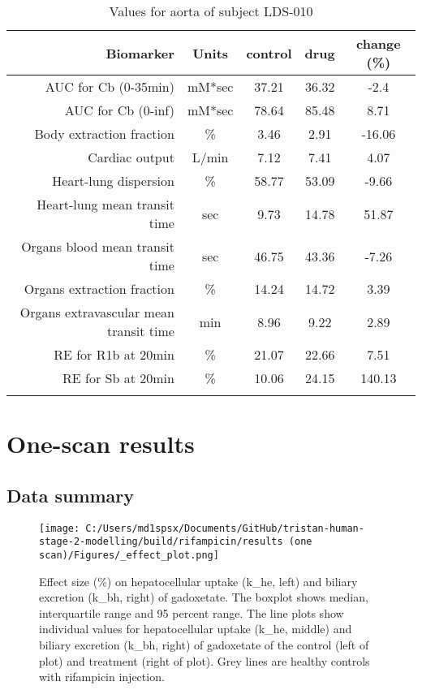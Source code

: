 \documentclass{epflreport}%
\begin{document}
\begin{longtable}{rcccc}%
\hline%
Biomarker&Units&control&drug&change (\%)\\%
\hline%
AUC for Cb (0{-}35min)&mM*sec&37.21&36.32&{-}2.4\\%
AUC for Cb (0{-}inf)&mM*sec&78.64&85.48&8.71\\%
Body extraction fraction&\%&3.46&2.91&{-}16.06\\%
Cardiac output&L/min&7.12&7.41&4.07\\%
Heart{-}lung dispersion&\%&58.77&53.09&{-}9.66\\%
Heart{-}lung mean transit time&sec&9.73&14.78&51.87\\%
Organs blood mean transit time&sec&46.75&43.36&{-}7.26\\%
Organs extraction fraction&\%&14.24&14.72&3.39\\%
Organs extravascular mean transit time&min&8.96&9.22&2.89\\%
RE for R1b at 20min&\%&21.07&22.66&7.51\\%
RE for Sb at 20min&\%&10.06&24.15&140.13\\%
\hline%
\caption{Values for aorta of subject LDS-010} \\%
\end{longtable}%
\clearpage%
\chapter{One{-}scan results}%
\section{Data summary}%
\label{sec:Datasummary}%

%


\begin{figure}[h!]%
\centering%
\texttt{[image: C:/Users/md1spsx/Documents/GitHub/tristan-human-stage-2-modelling/build/rifampicin/results (one scan)/Figures/\_effect\_plot.png]}%
\caption{Effect size (\%) on hepatocellular uptake (k\_he, left) and biliary excretion (k\_bh, right) of gadoxetate. The boxplot shows median, interquartile range and 95 percent range. The line plots show individual values for hepatocellular uptake (k\_he, middle) and biliary excretion (k\_bh, right) of gadoxetate of the control (left of plot) and treatment (right of plot). Grey lines are healthy controls with rifampicin injection.}%
\end{figure}
\end{document}
